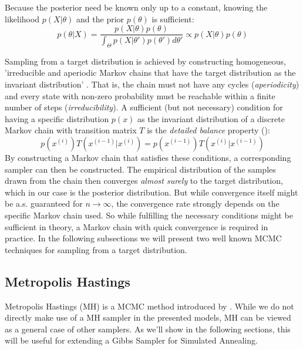 Because the posterior need be known only up to a constant, knowing the likelihood $p(X|\theta)$ and the prior $p(\theta)$ is sufficient:
$$
p(\theta|X) = \frac{p(X|\theta)p(\theta)}{\int_\Theta p(X|\theta')p(\theta') d\theta'} \propto p(X|\theta)p(\theta)
$$

Sampling from a target distribution is achieved by constructing homogeneous, 'irreducible and aperiodic Markov chains that have the target distribution as the invariant distribution' \citep{andrieu2003introduction}.
That is, the chain must not have any cycles (\textit{aperiodicity}) and every state with non-zero probability must be reachable within a finite number of steps (\textit{irreducibility}).
A sufficient (but not necessary) condition for having a specific distribution $p(x)$ as the invariant distribution of a discrete Markov chain with transition matrix $T$ is the \textit{detailed balance} property (\cite[Chapter 11.2.1]{Bishop:2006:PRM:1162264}):
\begin{equation}
	\label{eq:mcmc_invar}
	p(x^{(i)})T(x^{(i-1)} | x^{(i)})=  p(x^{(i-1)})T(x^{(i)} | x^{(i-1)})
\end{equation}
By constructing a Markov chain that satisfies these conditions, a corresponding sampler can then be constructed.
The empirical distribution of the samples drawn from the chain then converges \textit{almost surely} to the target distribution, which in our case is the posterior distribution.
But while convergence itself might be a.s. guaranteed for $n\rightarrow \infty$, the convergence rate
strongly depends on the specific Markov chain used. So while fulfilling the necessary conditions might be sufficient in theory, a Markov chain with quick convergence is required in practice.
In the following subsections we will present two well known MCMC techniques for sampling from a target distribution.
 
\subsection{Metropolis Hastings}
Metropolis Hastings (MH) is a \gls{MCMC} method introduced by \citet{hastings1970monte}.
While we do not directly make use of a \gls{MH} sampler in the presented models, \gls{MH} can be viewed as a general case of other samplers. 
As we'll show in the following sections, this will be useful for extending a Gibbs Sampler for Simulated Annealing.

